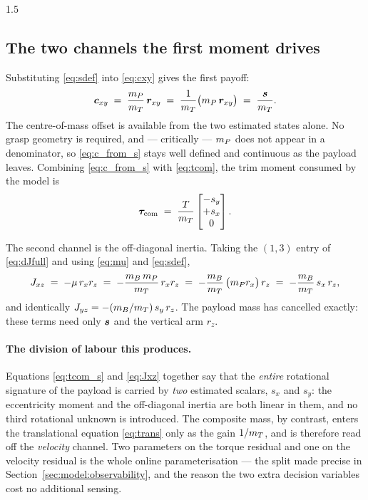 \begin{spacing}{1.5}
\subsection{The two channels the first moment drives}\label{sec:model:schannels}

Substituting \eqref{eq:sdef} into \eqref{eq:cxy} gives the first payoff:
\begin{equation}
\bm{c}_{xy} \;=\; \frac{m_P}{m_T}\,\bm{r}_{xy}
      \;=\; \frac{1}{m_T}\bigl(m_P\,\bm{r}_{xy}\bigr)
      \;=\; \frac{\bm{s}}{m_T}.
\label{eq:c_from_s}
\end{equation}
The centre-of-mass offset is available from the two estimated states alone. No
grasp geometry is required, and --- critically --- $m_P$ does not appear in a
denominator, so \eqref{eq:c_from_s} stays well defined and continuous as the
payload leaves. Combining \eqref{eq:c_from_s} with \eqref{eq:tcom}, the trim
moment consumed by the model is
\begin{equation}
\bm{\tau}_{\mathrm{com}} \;=\; \frac{T}{m_T}\begin{bmatrix} -s_y \\ +s_x \\ 0\end{bmatrix}.
\label{eq:tcom_s}
\end{equation}

The second channel is the off-diagonal inertia. Taking the $(1,3)$ entry of
\eqref{eq:dJfull} and using \eqref{eq:mu} and \eqref{eq:sdef},
\begin{equation}
J_{xz} \;=\; -\mu\, r_x r_z
 \;=\; -\frac{m_B\,m_P}{m_T}\, r_x r_z
 \;=\; -\frac{m_B}{m_T}\,\bigl(m_P r_x\bigr)\, r_z
 \;=\; -\frac{m_B}{m_T}\, s_x\, r_z ,
\label{eq:Jxz}
\end{equation}
and identically $J_{yz} = -(m_B/m_T)\, s_y\, r_z$. The payload mass has cancelled
exactly: these terms need only $\bm{s}$ and the vertical arm $r_z$.

\paragraph{The division of labour this produces.} Equations \eqref{eq:tcom_s} and
\eqref{eq:Jxz} together say that the \emph{entire} rotational signature of the
payload is carried by \emph{two} estimated scalars, $s_x$ and $s_y$: the
eccentricity moment and the off-diagonal inertia are both linear in them, and no
third rotational unknown is introduced. The composite mass, by contrast, enters
the translational equation \eqref{eq:trans} only as the gain $1/m_T$, and is
therefore read off the \emph{velocity} channel. Two parameters on the torque
residual and one on the velocity residual is the whole online parameterisation
--- the split made precise in Section~\ref{sec:model:observability}, and the
reason the two extra decision variables cost no additional sensing.


\end{spacing}
